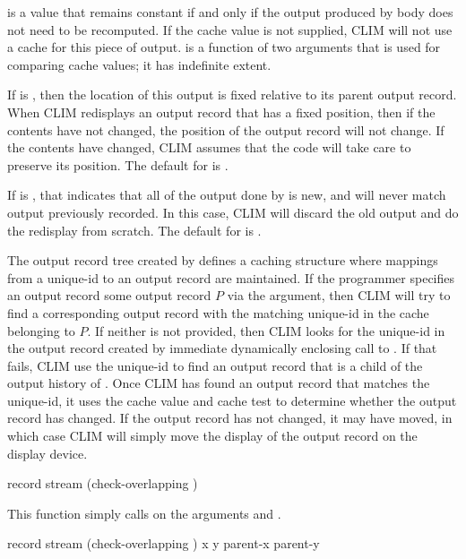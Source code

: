  is a value that remains constant if and only if the output
produced by body does not need to be recomputed.  If the cache value is not
supplied, CLIM will not use a cache for this piece of output.  
is a function of two arguments that is used for comparing cache values; it has
indefinite extent.

If  is , then the location of this output is
fixed relative to its parent output record.  When CLIM redisplays an output
record that has a fixed position, then if the contents have not changed, the
position of the output record will not change.  If the contents have changed,
CLIM assumes that the code will take care to preserve its position.  The default
for  is .

If  is , that indicates that all of the output done by
 is new, and will never match output previously recorded.  In this
case, CLIM will discard the old output and do the redisplay from scratch.  The
default for  is .

The output record tree created by  defines a caching
structure where mappings from a unique-id to an output record are maintained.
If the programmer specifies an output record some output record $P$ via the
 argument, then CLIM will try to find a corresponding output
record with the matching unique-id in the cache belonging to $P$.  If neither
 is not provided, then CLIM looks for the unique-id in the
output record created by immediate dynamically enclosing call to
.  If that fails, CLIM use the unique-id to find an output
record that is a child of the output history of .  Once CLIM has
found an output record that matches the unique-id, it uses the cache value and
cache test to determine whether the output record has changed.  If the output
record has not changed, it may have moved, in which case CLIM will simply move
the display of the output record on the display device.


 {record stream \key (check-overlapping )}

This function simply calls  on the arguments
 and .

 {record stream
                                       \optional (check-overlapping ) 
                                                 x y parent-x parent-y}  

